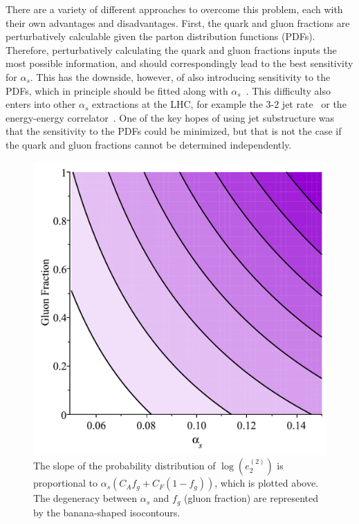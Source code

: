\documentclass[11pt]{cernrep}
\begin{document}
There are a variety of different approaches to overcome this problem, each with their own advantages and disadvantages.
%
First, the quark and gluon fractions are perturbatively calculable given the parton distribution functions (PDFs).
%
Therefore, perturbatively calculating the quark and gluon fractions inputs the most possible information, and should correspondingly lead to the best sensitivity for $\alpha_s$.
%
This has the downside, however, of also introducing sensitivity to the PDFs, which in principle should be fitted along with $\alpha_s$~\cite{Accardi:2016ndt}.
%
This difficulty also enters into other $\alpha_s$ extractions at the LHC, for example the $3$-$2$ jet rate~\cite{Chatrchyan:2013txa} or the energy-energy correlator~\cite{ATLAS:2015yaa,Aaboud:2017fml}.
%
One of the key hopes of using jet substructure was that the sensitivity to the PDFs could be minimized, but that is not the case if the quark and gluon fractions cannot be determined independently.

\begin{figure}[t]
\begin{center}
\includegraphics[width = 0.4\columnwidth]{jetsub_alphas_Degeneracy}
\end{center}
\caption{The slope of the probability distribution of $\log(e_2^{(2)})$ is proportional to $\alpha_s(C_Af_g+C_F(1-f_g))$, which is plotted above.  The degeneracy between $\alpha_s$ and $f_g$ (gluon fraction) are represented by the banana-shaped isocontours. }
\label{jetsub_alphas_fig:analyticbanana}
\end{figure}
\end{document}
